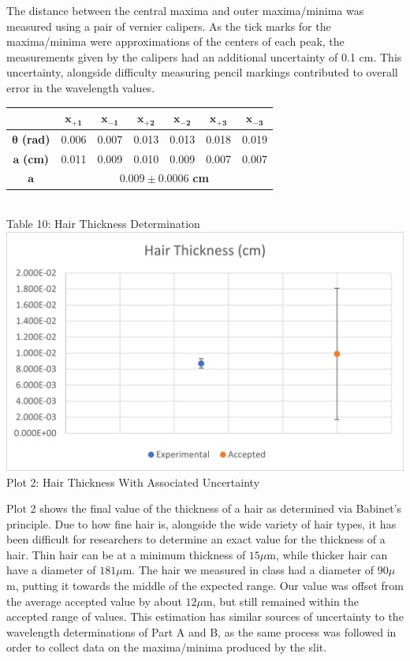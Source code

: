 The distance between the central maxima and outer maxima/minima was measured using a pair of vernier calipers. 
As the tick marks for the maxima/minima were approximations of the centers of each peak, the measurements given by the calipers had an additional uncertainty of 0.1 cm.
This uncertainty, alongside difficulty measuring pencil markings contributed to overall error in the wavelength values.
\begin{center}
    \begin{tabular}{|c|c|c|c|c|c|c|}
        \hline
        & $\bm{x_{+1}}$ &$\bm{x_{-1}}$ & $\bm{x_{+2}}$ & $\bm{x_{-2}}$ & $\bm{x_{+3}}$ & $\bm{x_{-3}}$  \\ \hline
        $\bm{\theta}$ \textbf{(rad)} & 0.006 & 0.007 & 0.013 & 0.013 & 0.018 & 0.019\\
        $\bm{a}$ \textbf{(cm)}       & 0.011 & 0.009 & 0.010 & 0.009 & 0.007 & 0.007 \\ \hline
        $\bm{a}$ & \multicolumn{6}{|c|}{$0.009\pm0.0006$ \textbf{ cm}}\\\hline
    \end{tabular} 
    \vspace{3mm}
    \\ Table 10: Hair Thickness Determination\\
    \vspace{5mm}
    \includegraphics*[]{Hair Thickness.jpg}
    \\Plot 2: Hair Thickness With Associated Uncertainty
\end{center}
Plot 2 shows the final value of the thickness of a hair as determined via Babinet's principle. 
Due to how fine hair is, alongside the wide variety of hair types, it has been difficult for researchers to determine an exact value for the thickness of a hair.
Thin hair can be at a minimum thickness of $15 \mu$m, while thicker hair can have a diameter of $181 \mu$m. 
The hair we measured in class had a diameter of $90 \mu$m, putting it towards the middle of the expected range. Our value was offset from the average accepted value by about $12 \mu$m, but still remained within the accepted range of values.
This estimation has similar sources of uncertainty to the wavelength determinations of Part A and B, as the same process was followed in order to collect data on the maxima/minima produced by the slit.
